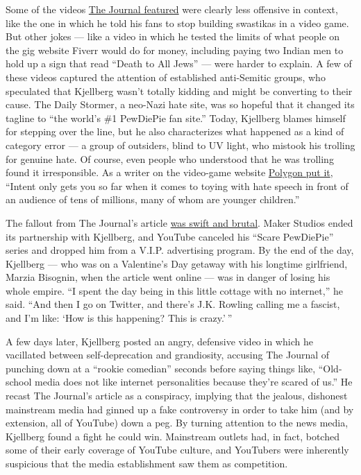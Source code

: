 Some of the videos
\href{https://www.wsj.com/articles/disney-severs-ties-with-youtube-star-pewdiepie-after-anti-semitic-posts-1487034533}{The
Journal featured} were clearly less offensive in context, like the one
in which he told his fans to stop building swastikas in a video game.
But other jokes --- like a video in which he tested the limits of what
people on the gig website Fiverr would do for money, including paying
two Indian men to hold up a sign that read ``Death to All Jews'' ---
were harder to explain. A few of these videos captured the attention of
established anti-Semitic groups, who speculated that Kjellberg wasn't
totally kidding and might be converting to their cause. The Daily
Stormer, a neo-Nazi hate site, was so hopeful that it changed its
tagline to ``the world's \#1 PewDiePie fan site.'' Today, Kjellberg
blames himself for stepping over the line, but he also characterizes
what happened as a kind of category error --- a group of outsiders,
blind to UV light, who mistook his trolling for genuine hate. Of course,
even people who understood that he was trolling found it irresponsible.
As a writer on the video-game website
\href{https://www.polygon.com/2017/2/15/14610652/pewdiepie-versus-the-media-disney-youtube-google}{Polygon
put it}, ``Intent only gets you so far when it comes to toying with hate
speech in front of an audience of tens of millions, many of whom are
younger children.''

The fallout from The Journal's article
\href{https://www.nytimes3xbfgragh.onion/2017/02/14/business/pewdiepie-youtube-disney.html}{was
swift and brutal}. Maker Studios ended its partnership with Kjellberg,
and YouTube canceled his ``Scare PewDiePie'' series and dropped him from
a V.I.P. advertising program. By the end of the day, Kjellberg --- who
was on a Valentine's Day getaway with his longtime girlfriend, Marzia
Bisognin, when the article went online --- was in danger of losing his
whole empire. ``I spent the day being in this little cottage with no
internet,'' he said. ``And then I go on Twitter, and there's J.K.
Rowling calling me a fascist, and I'm like: `How is this happening? This
is crazy.' ''

A few days later, Kjellberg posted an angry, defensive video in which he
vacillated between self-deprecation and grandiosity, accusing The
Journal of punching down at a ``rookie comedian'' seconds before saying
things like, ``Old-school media does not like internet personalities
because they're scared of us.'' He recast The Journal's article as a
conspiracy, implying that the jealous, dishonest mainstream media had
ginned up a fake controversy in order to take him (and by extension, all
of YouTube) down a peg. By turning attention to the news media,
Kjellberg found a fight he could win. Mainstream outlets had, in fact,
botched some of their early coverage of YouTube culture, and YouTubers
were inherently suspicious that the media establishment saw them as
competition.

